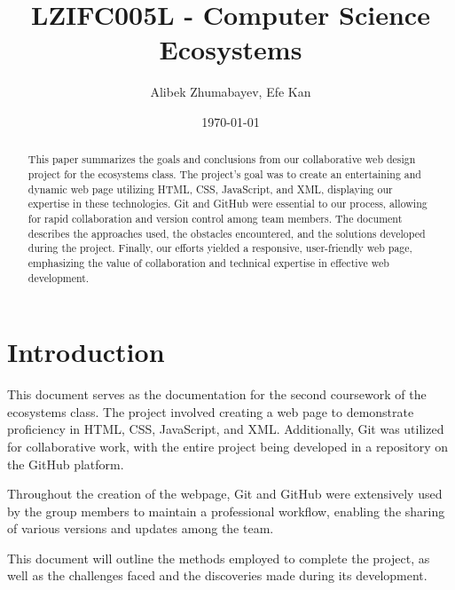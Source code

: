 \documentclass{article}
\title{\textbf{ LZIFC005L - Computer Science Ecosystems}}
\author{Alibek Zhumabayev, Efe Kan}
\date{\today}
\begin{document}
\maketitle

\begin{abstract}
\justifying
This paper summarizes the goals and conclusions from our collaborative web design project for the ecosystems class. The project's goal was to create an entertaining and dynamic web page utilizing HTML, CSS, JavaScript, and XML, displaying our expertise in these technologies. Git and GitHub were essential to our process, allowing for rapid collaboration and version control among team members. The document describes the approaches used, the obstacles encountered, and the solutions developed during the project. Finally, our efforts yielded a responsive, user-friendly web page, emphasizing the value of collaboration and technical expertise in effective web development.

\end{abstract}

\section{Introduction}
This document serves as the documentation for the second coursework of the ecosystems class. The project involved creating a web page to demonstrate proficiency in HTML, CSS, JavaScript, and XML. Additionally, Git was utilized for collaborative work, with the entire project being developed in a repository on the GitHub platform.

Throughout the creation of the webpage, Git and GitHub were extensively used by the group members to maintain a professional workflow, enabling the sharing of various versions and updates among the team.

This document will outline the methods employed to complete the project, as well as the challenges faced and the discoveries made during its development.
\end{document}

